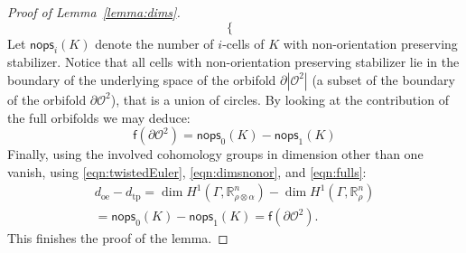 \documentclass[a4paper,11pt]{article}
\begin{document}
\begin{proof}[Proof of Lemma~\ref{lemma:dims}]
\begin{equation}
\begin{cases}
  \end{cases}
\end{equation}
Let $\mathsf{nops}_i(K)$ denote the number of $i$-cells of $K$ with non-orientation preserving stabilizer. Notice that all cells
with  non-orientation preserving stabilizer lie in the boundary of the underlying space of the orbifold $\partial|\mathcal O^2| $ (a subset of
 the boundary  of the orbifold $\partial\mathcal O^2 $),
that is a union of circles. By looking at the contribution of the full orbifolds
we may deduce:
\begin{equation}
 \label{eqn:fulls}
\mathsf{f}(\partial \mathcal O^2) =\mathsf{nops}_0(K)-\mathsf{nops}_1(K)
\end{equation}
Finally, using the involved cohomology groups in dimension other than one vanish, using
\eqref{eqn:twistedEuler}, \eqref{eqn:dimsnonor},
and \eqref{eqn:fulls}:
\begin{multline*}
 d_{\mathrm{oe}}-d_{\mathrm{tp}}=\dim H^1(\Gamma,\mathbb R^n_{\rho\otimes \alpha})- \dim H^1(\Gamma,\mathbb R^n_{\rho})
\\
 =\mathsf{nops}_0(K)-\mathsf{nops}_1(K)=
\mathsf{f}(\partial \mathcal O^2).
\end{multline*}
This finishes the proof of the lemma.
\end{proof}
\end{document}
